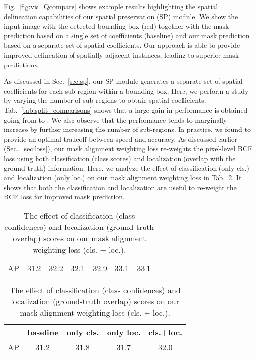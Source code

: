 \documentclass[runningheads]{llncs}
\begin{document}
Fig.~\ref{fig:vis_Qcompare} shows example results highlighting the spatial delineation capabilities of our spatial preservation (SP) module. We show the input image with the detected bounding-box (red) together with the mask prediction based on a single set of coefficients (baseline) and our mask prediction based on a separate set of spatial coefficients. Our approach is able to provide improved delineation of spatially adjacent instances, leading to superior mask predictions. 

As discussed in Sec.~\ref{sec:sp}, our SP module generates a separate set of spatial coefficients for each sub-region within a bounding-box. Here, we perform a study by varying the number of sub-regions to obtain spatial coefficients. Tab.~\ref{tab:split_comparisons} shows that a large gain in performance is obtained going from  to . We also observe that the performance tends to marginally increase by further increasing the number of sub-regions. In practice, we found  to provide an optimal tradeoff between speed and accuracy. As discussed earlier (Sec.~\ref{sec:loss}), our mask alignment weighting loss re-weights the pixel-level BCE loss using both classification (class scores) and localization (overlap with the ground-truth) information. Here, we analyze the effect of classification (only cls.) and localization (only loc.) on our mask alignment weighting loss in Tab.~\ref{tab:loss_comparison}. It shows that both the classification and localization are useful to re-weight the BCE loss for improved mask prediction. 





\begin{table}[t!]
\parbox{0.475\linewidth}{
\centering
\caption{The effect of varying the number of sub-regions to compute spatial coefficients. A separate set of spatial coefficients are generated for each sub-region.}
\begin{tabular}{|c|c|c|c|c|c|c|}
\hline
& &  &  &   &    &    \\  \hline \hline 
AP & 31.2 & 32.2 & 32.1 & 32.9 & 33.1 & 33.1 \\ \hline
\end{tabular}    
\label{tab:split_comparisons}
}
\hfill
\parbox{0.475\linewidth}{
\centering
\caption{The effect of classification (class confidences) and localization (ground-truth overlap) scores on our mask alignment weighting loss (cls. + loc.). 
} 
\begin{tabular}{|c|c|c|c|c|}
\hline
& baseline & only cls. & only loc. & cls.+loc.    \\  \hline \hline 
AP & 31.2 & 31.8 & 31.7 & 32.0 \\ \hline
\end{tabular}
\label{tab:loss_comparison}
}\end{table}
\end{document}
